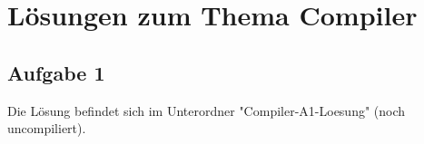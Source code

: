 \documentclass{scrartcl}
\begin{document}
\section*{Lösungen zum Thema Compiler}
\subsection*{Aufgabe 1}
Die Lösung befindet sich im Unterordner "Compiler-A1-Loesung" (noch uncompiliert).
\end{document}
